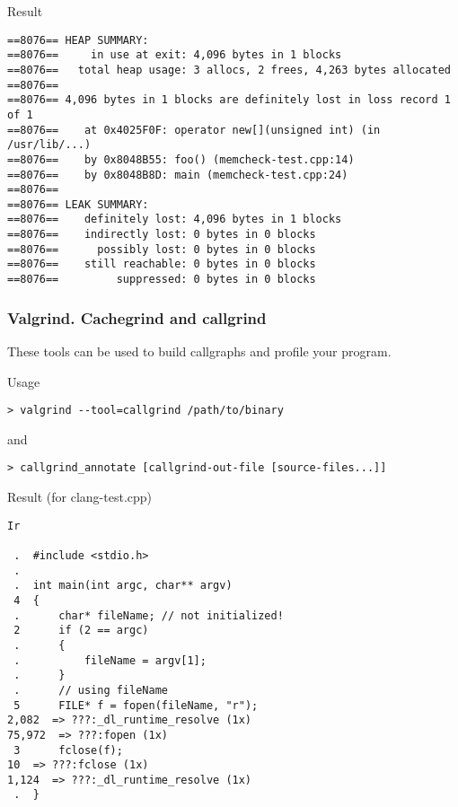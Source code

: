 \documentclass{beamer}
\begin{document}
\begin{frame}[fragile]
\begin{exampleblock}{Result}
\begin{Verbatim}[fontsize=\footnotesize]
==8076== HEAP SUMMARY:
==8076==     in use at exit: 4,096 bytes in 1 blocks
==8076==   total heap usage: 3 allocs, 2 frees, 4,263 bytes allocated
==8076==
==8076== 4,096 bytes in 1 blocks are definitely lost in loss record 1 of 1
==8076==    at 0x4025F0F: operator new[](unsigned int) (in /usr/lib/...)
==8076==    by 0x8048B55: foo() (memcheck-test.cpp:14)
==8076==    by 0x8048B8D: main (memcheck-test.cpp:24)
==8076==
==8076== LEAK SUMMARY:
==8076==    definitely lost: 4,096 bytes in 1 blocks
==8076==    indirectly lost: 0 bytes in 0 blocks
==8076==      possibly lost: 0 bytes in 0 blocks
==8076==    still reachable: 0 bytes in 0 blocks
==8076==         suppressed: 0 bytes in 0 blocks
\end{Verbatim}
\end{exampleblock}
\end{frame}

\begin{frame}[fragile]
\frametitle{Valgrind. Cachegrind and callgrind}
These tools can be used to build callgraphs and profile your program.
\begin{exampleblock}{Usage}
\begin{verbatim}
> valgrind --tool=callgrind /path/to/binary
\end{verbatim}
and
\begin{verbatim}
> callgrind_annotate [callgrind-out-file [source-files...]]
\end{verbatim}
\end{exampleblock}
\end{frame}

\begin{frame}[fragile]
\begin{exampleblock}{Result (for clang-test.cpp)}
\begin{Verbatim}[fontsize=\footnotesize]
Ir

 .  #include <stdio.h>
 .
 .  int main(int argc, char** argv)
 4  {
 .      char* fileName; // not initialized!
 2      if (2 == argc)
 .      {
 .          fileName = argv[1];
 .      }
 .      // using fileName
 5      FILE* f = fopen(fileName, "r");
2,082  => ???:_dl_runtime_resolve (1x)
75,972  => ???:fopen (1x)
 3      fclose(f);
10  => ???:fclose (1x)
1,124  => ???:_dl_runtime_resolve (1x)
 .  }
\end{Verbatim}
\end{exampleblock}
\end{frame}
\end{document}
